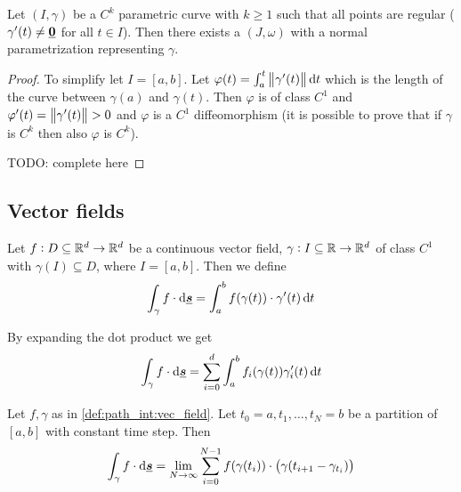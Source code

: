 \documentclass[12pt]{extarticle}
\renewcommand{\vec}[1]{\uvec{#1}}
\begin{document}
\begin{proposition}
    Let $(I, \gamma)$ be a $C^k$ parametric curve with $k \geq 1$ such that all points are regular ($\gamma'(t) \neq \vec 0$ for all $t \in I$).
    Then there exists a $(J, \omega)$ with a normal parametrization representing $\gamma$.
\end{proposition}

\begin{proof}
    To simplify let $I = [a, b]$. Let $\varphi(t) = \int_a^t \norm{\gamma'(t)}\dd{t}$ which is the length of the curve between $\gamma(a)$ and $\gamma(t)$.
    Then $\varphi$ is of class $C^1$ and $\varphi'(t) = \norm{\gamma'(t)} > 0$ and $\varphi$ is a $C^1$ diffeomorphism (it is possible to prove that if $\gamma$ is $C^k$ then also $\varphi$ is $C^k$).

    TODO: complete here
\end{proof}

\subsection{Vector fields}

\begin{definition}
    \label{def:path_int:vec_field}
    Let $f: D \subseteq \mathbb{R}^d \to \mathbb{R}^d$ be a continuous vector field, $\gamma: I \subseteq \mathbb{R} \to \mathbb{R}^d$ of class $C^1$ with $\gamma(I) \subseteq D$, where $I = [a, b]$.
    Then we define
    \begin{equation}
        \int_\gamma f \cdot \dd{\vec{s}} = \int_a^b f(\gamma(t)) \cdot \gamma'(t) \dd{t}
    \end{equation}
\end{definition}

\begin{remark}
    By expanding the dot product we get
    \begin{equation}
        \int_\gamma f \cdot \dd{\vec{s}} = \sum_{i = 0}^d \int_a^b f_i(\gamma(t))\gamma_i'(t) \dd{t}
    \end{equation}
\end{remark}

\begin{proposition}
    Let $f, \gamma$ as in \autoref{def:path_int:vec_field}.
    Let $t_0 = a, t_1, \dots, t_N = b$ be a partition of $[a, b]$ with constant time step.
    Then
    \begin{equation}
        \int_\gamma f \cdot \dd{\vec s} = \lim_{N \to \infty} \sum_{i = 0}^{N -1} f(\gamma(t_i)) \cdot \left( \gamma(t_{i+1} - \gamma_{t_i}) \right)
    \end{equation}
\end{proposition}
\end{document}
